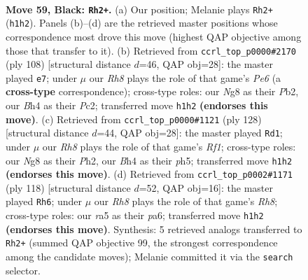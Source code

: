 \documentclass[11pt]{article}
\begin{document}
\clearpage

\begin{figure}[p]\centering
\begin{subfigure}{0.46\textwidth}\centering
\resizebox{\linewidth}{!}{%
\newchessgame
\chessboard[
  setfen={6n1/p6k/P6p/Rp3p2/1P2bP1b/1R6/4K3/1N5r b - - 9 59},
  showmover=false,
  pgfstyle=straightmove, color=movearrow, markmove={h1-h2}
]}
\caption{}
\end{subfigure}\hfill
\begin{subfigure}{0.46\textwidth}\centering
\resizebox{\linewidth}{!}{%
\newchessgame
\chessboard[
  setfen={6r1/2R3p1/p3P3/Bp1k2rP/8/P7/KPP5/8 w - - 1 55},
  showmover=false,
  pgfstyle=straightmove, color=movearrow, markmove={e6-e7}
]}
\caption{}
\end{subfigure}
\\[4pt]
\begin{subfigure}{0.46\textwidth}\centering
\resizebox{\linewidth}{!}{%
\newchessgame
\chessboard[
  setfen={8/n2r1p1k/1p1P2p1/7p/P1B2P2/1P6/7P/5R1K w - - 1 65},
  showmover=false,
  pgfstyle=straightmove, color=movearrow, markmove={f1-d1}
]}
\caption{}
\end{subfigure}\hfill
\begin{subfigure}{0.46\textwidth}\centering
\resizebox{\linewidth}{!}{%
\newchessgame
\chessboard[
  setfen={7R/4k3/p7/8/1Pp1r2p/2Pn3P/8/5BK1 w - - 3 60},
  showmover=false,
  pgfstyle=straightmove, color=movearrow, markmove={h8-h6}
]}
\caption{}
\end{subfigure}
\caption{\textbf{Move 59, Black: \texttt{Rh2+}.} (a) Our position; Melanie plays \texttt{Rh2+} (\texttt{h1h2}). Panels (b)--(d) are the retrieved master positions whose correspondence most drove this move (highest QAP objective among those that transfer to it). (b) Retrieved from \texttt{ccrl\_top\_p0000\#2170} (ply 108) [structural distance $d$=46, QAP obj=28]: the master played \texttt{e7}; under $\mu$ our \emph{Rh8} plays the role of that game's \emph{Pe6} (a \textbf{cross-type} correspondence); cross-type roles: our \emph{N}g8 as their \emph{P}b2, our \emph{B}h4 as their \emph{P}c2; transferred move \texttt{h1h2} \textbf{(endorses this move)}. (c) Retrieved from \texttt{ccrl\_top\_p0000\#1121} (ply 128) [structural distance $d$=44, QAP obj=28]: the master played \texttt{Rd1}; under $\mu$ our \emph{Rh8} plays the role of that game's \emph{Rf1}; cross-type roles: our \emph{N}g8 as their \emph{P}h2, our \emph{B}h4 as their \emph{p}h5; transferred move \texttt{h1h2} \textbf{(endorses this move)}. (d) Retrieved from \texttt{ccrl\_top\_p0002\#1171} (ply 118) [structural distance $d$=52, QAP obj=16]: the master played \texttt{Rh6}; under $\mu$ our \emph{Rh8} plays the role of that game's \emph{Rh8}; cross-type roles: our \emph{r}a5 as their \emph{p}a6; transferred move \texttt{h1h2} \textbf{(endorses this move)}. Synthesis: 5 retrieved analogs transferred to \texttt{Rh2+} (summed QAP objective 99, the strongest correspondence among the candidate moves); Melanie committed it via the \texttt{search} selector.}
\label{fig:thought-m117}
\end{figure}
\end{document}
